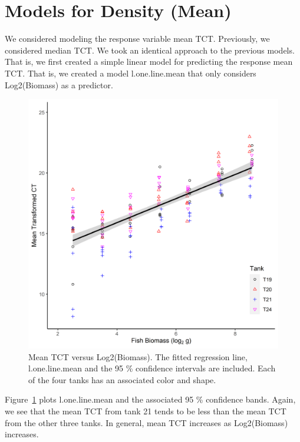 \section{Models for Density (Mean)}

We considered modeling the response variable mean TCT. Previously, we considered median TCT. We took an identical approach to the previous models. That is, we first created a simple linear model for predicting the response mean TCT. That is, we created a model l.one.line.mean that only considers Log2(Biomass) as a predictor.

\vspace{12pt}



\begin{figure}[H]
\includegraphics{Chapter3Images/ggplotnew3.png}
\caption{ \hspace{1mm}Mean TCT versus Log2(Biomass). The fitted regression line, l.one.line.mean and the 95 \% confidence intervals are included. Each of the four tanks has an associated color and shape.}
\label{fig:medct3}
\end{figure}

Figure~\ref{fig:medct3} plots l.one.line.mean and the associated 95 \% confidence bands.  Again, we see that the mean TCT from tank 21 tends to be less than the mean TCT from the other three tanks. In general, mean TCT increases as Log2(Biomass) increases.

